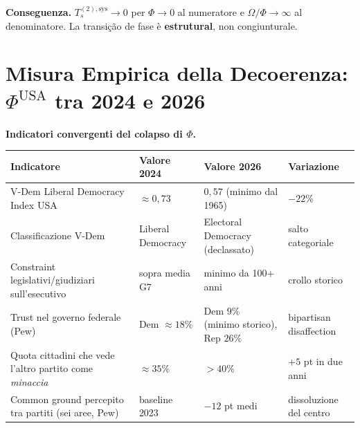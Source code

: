 \Proved{} \textbf{Conseguenza.} \(T_s^{(2),\text{sys}} \to 0\) per
\(\Phi \to 0\) al numeratore e \(\Omega/\Phi \to \infty\) al
denominatore. La transição de fase è \textbf{estrutural}, non
congiunturale.



\section{\texorpdfstring{Misura Empirica della Decoerenza:
\(\Phi^{\text{USA}}\) tra 2024 e
2026}{Misura Empirica della Decoerenza: \textbackslash Phi\^{}\{\textbackslash text\{USA\}\} tra 2024 e 2026}}\label{misura-empirica-della-decoerência-phitextusa-tra-2024-e-2026}

\Proved{} \textbf{Indicatori convergenti del colapso di \(\Phi\).}

{\def\LTcaptype{none} %
{\small\begin{longtable}[]{@{}
  >{\raggedright\arraybackslash}p{}
  >{\raggedright\arraybackslash}p{}
  >{\raggedright\arraybackslash}p{}
  >{\raggedright\arraybackslash}p{}@{}}
\toprule\noalign{}
\begin{minipage}[b]{\linewidth}\raggedright
Indicatore
\end{minipage} & \begin{minipage}[b]{\linewidth}\raggedright
Valore 2024
\end{minipage} & \begin{minipage}[b]{\linewidth}\raggedright
Valore 2026
\end{minipage} & \begin{minipage}[b]{\linewidth}\raggedright
Variazione
\end{minipage} \\
\midrule\noalign{}
\endhead
\bottomrule\noalign{}
\endlastfoot
V-Dem Liberal Democracy Index USA & \(\approx 0{,}73\) & \(0{,}57\)
(minimo dal 1965) & \(-22\%\) \\
Classificazione V-Dem & Liberal Democracy & Electoral Democracy
(declassato) & salto categoriale \\
Constraint legislativi/giudiziari sull'esecutivo & sopra media G7 &
minimo da 100+ anni & crollo storico \\
Trust nel governo federale (Pew) & Dem \(\approx 18\%\) & Dem \(9\%\)
(minimo storico), Rep \(26\%\) & bipartisan disaffection \\
Quota cittadini che vede l'altro partito come \emph{minaccia} &
\(\approx 35\%\) & \(> 40\%\) & \(+5\) pt in due anni \\
Common ground percepito tra partiti (sei aree, Pew) & baseline 2023 &
\(-12\) pt medi & dissoluzione del centro \\
\end{longtable}}
}

